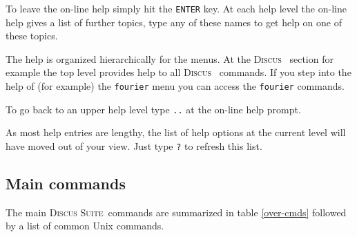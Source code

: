 \documentclass[11pt]{report}
\newcommand{\Discus}{\textsc{Discus\ }}
\newcommand{\Suite}{\textsc{Discus Suite\ }}
\begin{document}
{To leave the on-line help simply hit the {\tt ENTER} key. At each 
help level the on-line help gives a list of further topics, type
any of these names to get help on one of these topics. 

The help is organized hierarchically for the menus. At the \Discus
section for example the top level provides help to all \Discus
commands. If you step into the help of (for example) the 
{\tt fourier} menu you can access the {\tt fourier} commands. 

To go back to an upper help level type {\tt ..} at the 
on-line help prompt.

As most help entries are lengthy, the list of help options at
the current level will have moved out of your view. Just type
{\tt ?} to refresh this list.

\subsection{Main commands} \label{over-main}

The main \Suite commands are summarized in table \ref{over-cmds}
followed by a list of common Unix commands.

}
\end{document}
